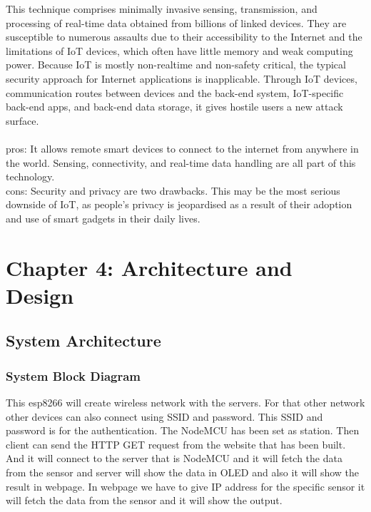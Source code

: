 \documentclass[12pt,a4paper,twocolumn,fleqn]{article}
\begin{document}
This technique comprises minimally invasive sensing, transmission, and processing of real-time data obtained from billions of linked devices. They are susceptible to numerous assaults due to their accessibility to the Internet and the limitations of IoT devices, which often have little memory and weak computing power. Because IoT is mostly non-realtime and non-safety critical, the typical security approach for Internet applications is inapplicable. Through IoT devices, communication routes between devices and the back-end system, IoT-specific back-end apps, and back-end data storage, it gives hostile users a new attack surface.
\\ \\
pros: It allows remote smart devices to connect to the internet from anywhere in the world. Sensing, connectivity, and real-time data handling are all part of this technology.\\
 
cons: Security and privacy are two drawbacks. This may be the most serious downside of IoT, as people's privacy is jeopardised as a result of their adoption and use of smart gadgets in their daily lives. 

\newpage
  \pagestyle{fancy}
  \thispagestyle{empty}
  \thispagestyle{plain}
  \fancyhf{}
  \chead{}
\renewcommand{\footrulewidth}{0.4pt}%
\normalsize
\section{Chapter 4: Architecture and Design} 
\subsection{System Architecture}
\subsubsection{System Block Diagram}
This esp8266 will create wireless network with the servers. For that other network other devices can also connect using SSID and password. This SSID and password is for the authentication. The NodeMCU has been set as station. Then client can send the HTTP GET request from the website that has been built. And it will connect to the server that is NodeMCU and it will fetch the data from the sensor and server will show the data in OLED and also it will show the result in webpage. In webpage we have to give IP address for the specific sensor it will fetch the data from the sensor and it will show the output.
\\
\end{document}
